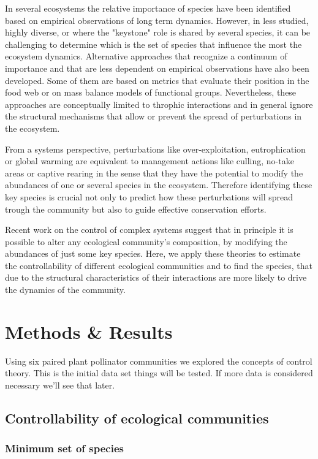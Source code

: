 In several ecosystems the relative importance of species have been identified based on empirical observations of long term dynamics. However, in less studied, highly diverse, or where the "keystone" role is shared by several species, it can be challenging to determine which is the set of species that influence the most the ecosystem dynamics. Alternative approaches that recognize a continuum of importance and that are less dependent on empirical observations have also been developed. Some of them are based on metrics that evaluate their position in the food web or on mass balance models of functional groups. Nevertheless, these approaches are conceptually limited to throphic interactions and in general ignore the structural mechanisms that allow or prevent the spread of perturbations in the ecosystem.

From a systems perspective, perturbations like over-exploitation, eutrophication or global warming are equivalent to management actions like culling, no-take areas or captive rearing in the sense that they have the potential to modify the abundances of one or several species in the ecosystem. Therefore identifying these key species is crucial not only to predict how these perturbations will spread trough the community but also to guide effective conservation efforts.

Recent work on the control of complex systems suggest that in principle it is possible to alter any ecological community's composition, by modifying the abundances of just some key species. Here, we apply these theories to estimate the controllability of different ecological communities and to find the species, that due to the structural characteristics of their interactions are more likely to drive the dynamics of the community. 

\section*{Methods \& Results}

Using six paired plant pollinator communities we explored the concepts of control theory. This is the initial data set things will be tested. If more data is considered necessary we'll see that later. 

\subsection*{Controllability of ecological communities}

\subsubsection*{Minimum set of species } 

